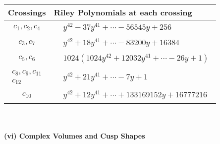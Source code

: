 \documentclass[1p]{elsarticle_modified}
\theoremstyle{definition}
\begin{document}
\begin{tabular}{m{50pt}|m{274pt}}
Crossings & \hspace{64pt}Riley Polynomials at each crossing \\
\hline $$\begin{aligned}c_{1},c_{2},c_{4}\end{aligned}$$&$\begin{aligned}
&y^{42}-37 y^{41}+\cdots-56545 y+256
\end{aligned}$\\
\hline $$\begin{aligned}c_{3},c_{7}\end{aligned}$$&$\begin{aligned}
&y^{42}+18 y^{41}+\cdots-83200 y+16384
\end{aligned}$\\
\hline $$\begin{aligned}c_{5},c_{6}\end{aligned}$$&$\begin{aligned}
&1024(1024 y^{42}+12032 y^{41}+\cdots-26 y+1)
\end{aligned}$\\
\hline $$\begin{aligned}c_{8},c_{9},c_{11}\\c_{12}\end{aligned}$$&$\begin{aligned}
&y^{42}+21 y^{41}+\cdots-7 y+1
\end{aligned}$\\
\hline $$\begin{aligned}c_{10}\end{aligned}$$&$\begin{aligned}
&y^{42}+12 y^{41}+\cdots+133169152 y+16777216
\end{aligned}$\\
\hline
\end{tabular}\\~\\
\newpage\flushleft \textbf{(vi) Complex Volumes and Cusp Shapes}
\end{document}

